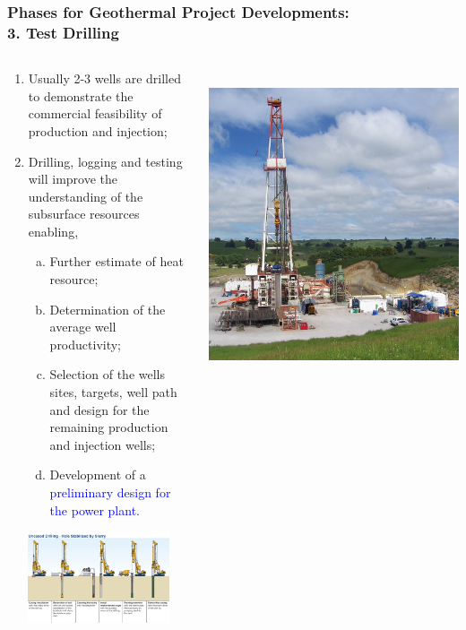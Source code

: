 \documentclass[10pt,compress]{beamer}
\newcommand{\blue}{\textcolor{blue}}
\begin{document}
\begin{frame}
\begin{frame}
 \frametitle{Phases for Geothermal Project Developments: \\ 3. Test Drilling}
  \begin{columns}
    \begin{column}[l]{0.45\linewidth}     
       \begin{enumerate}[{3.}1]\scriptsize
          \item <1-> Usually 2-3 wells are drilled to demonstrate the commercial feasibility of production and injection;
          \item <2-> Drilling, logging and testing will improve the understanding of the subsurface resources enabling,  
          \begin{enumerate}[(a)]\scriptsize
             \item<3-> Further estimate of heat resource;
             \item<4-> Determination of the average well productivity;
             \item<5-> Selection of the wells sites, targets, well path and design for the remaining production and injection wells;
             \item<6-> Development of a \blue{preliminary design for the power plant}.
          \end{enumerate}
       \end{enumerate}
           \includegraphics[width=5.6cm,height=2.7cm,clip]{./Pics/Uncased-Drilling-1.jpg}
    \end{column}
    \begin{column}[l]{0.55\linewidth} 
       \vbox{
          \hbox{
             \includegraphics[width=0.5\columnwidth,clip]{./Pics/Geothermal_drilling_at_Te_Mihi_NZ.jpg}
}}
\end{column}
\end{columns}
\end{frame}
\end{frame}
\end{document}
